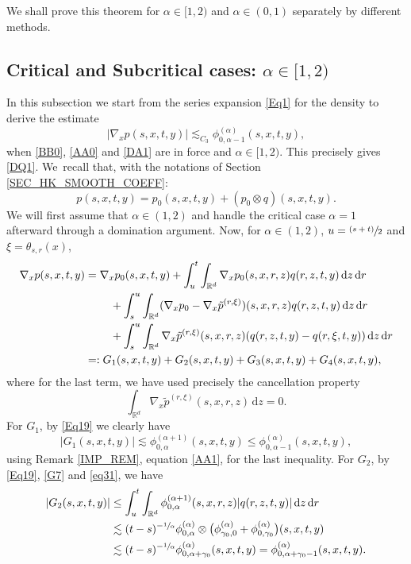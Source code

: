 \documentclass[11pt]{article}
\numberwithin{equation}{section}\providecommand{\asymp}{\mathrel{\sim}}
\newcommand{\psfrac}[2]{\sfrac{(#1)}{#2}}
\theoremstyle{plain}
\theoremstyle{definition}
\newcommand\mR{\mathbb{R}}
\newcommand\1{{\mathbf{1}}}
\newcommand{\dif}{\,\mathrm{d}}
\begin{document}
We shall prove this theorem for $\alpha\in[1,2)$ and $\alpha\in(0,1)$ separately by different methods.

\subsection{Critical and Subcritical cases: $\alpha\in[1,2)$}
In this subsection we start from the series expansion \eqref{Eq1} for the density to derive the estimate
\begin{equation}\label{GR}
|\nabla_x p(s,x,t,y)|\lesssim_{C_3}\phi^{(\alpha)}_{0,\alpha-1}(s,x,t,y),
\end{equation}
when \eqref{BB0}, \eqref{AA0} and \eqref{DA1} are in force and $\alpha\in[1,2)$.
{This precisely gives \eqref{DQ1}}. We~recall that, with the notations of Section \ref{SEC_HK_SMOOTH_COEFF}:
\[
p(s,x,t,y)=p_0(s,x,t,y)+(p_0\otimes q)(s,x,t,y).
\]
{We will first assume that $\alpha\in (1,2) $ and handle the critical case $\alpha=1 $ afterward through a domination argument.
Now, for $\alpha\in (1,2) $}, $u=\psfrac{s+t}{2}$ and $\xi=\theta_{s,r}(x)$,
\begin{equation}\label{CUT_GRAD_SUB_CRITICAL}
\begin{aligned}
\nabla_x p(s,x,t,y)&=\nabla_xp_0(s,x,t,y)
+\int_{u}^{t} \int_{\mR^d}\nabla_x {p}_0(s,x,r,z)q(r,z,t,y)\dif z \dif r\\
&\hspace*{.8cm}+\int_s^u\int_{\mR^d}(\nabla_x {p}_0-\nabla_x \tilde{p}^{(r,\xi)})(s,x,r,z)q(r,z,t,y)\dif z \dif r\\
&\hspace*{.8cm} + \int_s^u\int_{\mR^d}\nabla_x\tilde{p}^{(r,\xi)}(s,x,r,z)(q(r,z,t,y)-q(r,\xi,t,y))\dif z \dif r\\
&=:G_1(s,x,t,y)+G_2(s,x,t,y)+G_3(s,x,t,y)+G_4(s,x,t,y),
\end{aligned}
\end{equation}
where for the last term, we have used precisely the cancellation property
\[
\int_{\mR^d} \nabla_x\tilde{p}^{({r},\xi)}(s,x,r,z)\dif z=0.
\]
For $G_1$, by \eqref{Eq19} we clearly have
\[
|G_1(s,x,t,y)|\lesssim \phi^{(\alpha+1)}_{0,\alpha}(s,x,t,y)\leq\phi^{(\alpha)}_{0,\alpha-1}(s,x,t,y),
\]
using Remark \ref{IMP_REM}, equation \eqref{AA1}, for the last inequality.
For $G_2$, by \eqref{Eq19}, \eqref{G7} and \eqref{eq31}, we have
\begin{align*}
|G_2(s,x,t,y)|
&\le \int_u^t\int_{\mR^d } \phi_{0,\alpha}^{(\alpha+1)}(s,x,r,z) |q(r,z,t,y)|\dif z\dif r\\
&\lesssim (t-s)^{- \sfrac 1\alpha}\phi_{0,\alpha}^{(\alpha)}\otimes\bigl(\phi_{\gamma_0,0}^{(\alpha)} +\phi_{0,\gamma_0}^{(\alpha)}\bigr)(s,x,t,y)\\
&\lesssim (t-s)^{-\sfrac1\alpha} \phi_{0,\alpha+\gamma_0}^{(\alpha)}(s,x,t,y)=\phi_{0,\alpha+\gamma_0-1}^{(\alpha)}(s,x,t,y).
\end{align*}
\end{document}
